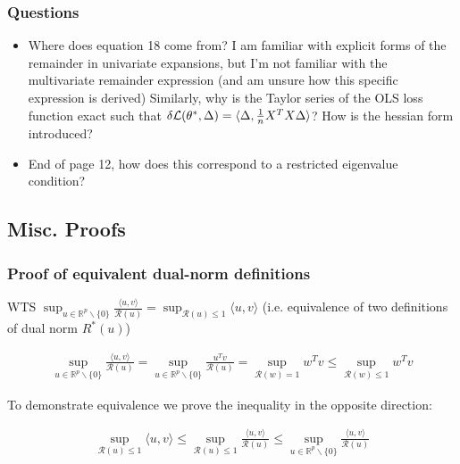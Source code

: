 \documentclass[11pt]{article}
\begin{document}
\subsubsection{Questions}
\begin{itemize}
    \item Where does equation 18 come from? I am familiar with explicit forms of the remainder in univariate expansions, but I'm not familiar with the multivariate remainder expression (and am unsure how this specific expression is derived)
    \subitem Similarly, why is the Taylor series of the OLS loss function exact such that $\delta\mathcal{L}(\theta^*, \Delta) = \langle\Delta, \frac{1}{n}X^TX\Delta\rangle$? How is the hessian form introduced?
\item End of page 12, how does this correspond to a restricted eigenvalue condition? 
\end{itemize}

\newpage 
\subsection*{Misc. Proofs}

\subsubsection{Proof of equivalent dual-norm definitions}

WTS $\sup_{u \in \mathbb{R}^p\backslash\{0\} } \frac{\langle u, v \rangle}{\mathcal{R}(u)} = \sup_{\mathcal{R}(u)\leq 1} \langle u,v \rangle$ (i.e. equivalence of two definitions of dual norm $R^*(u)$)

\begin{gather*}
    \sup_{u \in \mathbb{R}^p\backslash\{0\} } \frac{\langle u, v \rangle}{\mathcal{R}(u)} 
    =
    \sup_{u \in \mathbb{R}^p\backslash\{0\} } \frac{u^Tv}{\mathcal{R}(u)}
    =
    \sup_{\mathcal{R}(w)=1} w^{T}v
    \leq 
    \sup_{\mathcal{R}(w)\leq1} w^{T}v
\end{gather*}

To demonstrate equivalence we prove the inequality in the opposite direction:

\begin{gather*}
 	\sup_{\mathcal{R}(u)\leq 1} \langle u,v \rangle 
	\leq 
	\sup_{\mathcal{R}(u)\leq 1}\frac{\langle u,v \rangle}{\mathcal{R}(u)}
	\leq 
	\sup_{u \in \mathbb{R}^p\backslash\{0\} } \frac{\langle u, v \rangle}{\mathcal{R}(u)}
\end{gather*}
\end{document}
